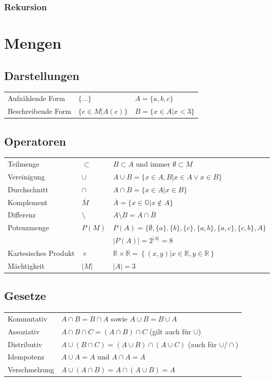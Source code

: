 \begin{multicols}{2}
\subsubsection{Rekursion}


\end{multicols}



\section{Mengen}

\subsection{Darstellungen}
	\begin{tabular}{l l l}	
		Aufzählende Form & $\{...\}$ & $A = \{a,b,c\}$ \\
		Beschreibende Form & $\{e \in M | A(e)\}$ & $B = \{x \in A | x<3 \}$ \\
	\end{tabular}

\subsection{Operatoren}
	\begin{tabular}{l l l}
		Teilmenge & $\subset$ & $B \subset A$ und immer $\emptyset \subset M$ \\
		Vereinigung & $\cup$ & $A \cup B = \{x \in A,B | x \in A \lor x \in B\}$ \\
		Durchschnitt & $\cap$ & $A \cap B = \{x \in A | x \in B\}$ \\
		Komplement & $\overline{M}$ & $\overline{A} = \{x \in \mathbb{G} | x \not\in A\}$ \\
		Differenz & $\setminus$ & $A \setminus B = A \cap \overline{B}$  \\
		Potenzmenge & $P(M)$ & $P(A) = \{\emptyset, \{a\}, \{b\}, \{c\}, \{a,b\}, \{a,c\},\{c,b\}, A\}$ \\
		& & $|P(A)|=2^{|A|} = 8$ \\
		Kartesisches Produkt & $\times$ & $\mathbb{R} \times \mathbb{R} = \left\{(x,y) | x \in \mathbb{R}, y \in \mathbb{R} \right\}$ \\
		Mächtigkeit & $|M|$ & $|A| = 3$
	\end{tabular}

\subsection{Gesetze}
	\begin{tabular}{l l}
		Kommutativ & $A \cap B = B \cap A$ sowie $A \cup B = B \cup A$ \\
		Assoziativ & $A \cap B \cap C = (A \cap B) \cap C$ (gilt auch für $\cup$) \\
		Distributiv & $A \cup (B \cap C) = ( A \cup B) \cap (A \cup C)$ (auch für $\cup / \cap$)\\
		Idempotenz & $A \cup A = A$ und $A \cap A = A$ \\
		Verschmelzung & $A \cup (A \cap B) = A \cap (A \cup B) = A$
	\end{tabular}

